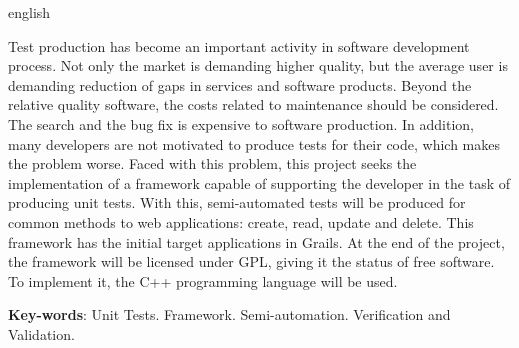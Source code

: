 \begin{resumo}[Abstract]
 \begin{otherlanguage*}{english}

\vspace{\onelineskip}
Test production has become an important activity in software development process.
Not only the market is demanding higher quality, but the average user is demanding
reduction of gaps in services and software products. Beyond the relative quality
software, the costs related to maintenance should be considered. The search and
the bug fix is expensive to software production. In addition, many developers are
not motivated to produce tests for their code, which makes the problem worse.
Faced with this problem, this project seeks the implementation of a framework
capable of supporting the developer in the task of producing unit tests. With
this, semi-automated tests will be produced for common methods to web applications:
create, read, update and delete. This framework has the initial target applications
in Grails. At the end of the project, the framework will be licensed under GPL,
giving it the status of free software. To implement it, the C++ programming
language will be used.
\noindent

   \textbf{Key-words}: Unit Tests. Framework. Semi-automation. Verification and Validation.
 \end{otherlanguage*}
\end{resumo}
